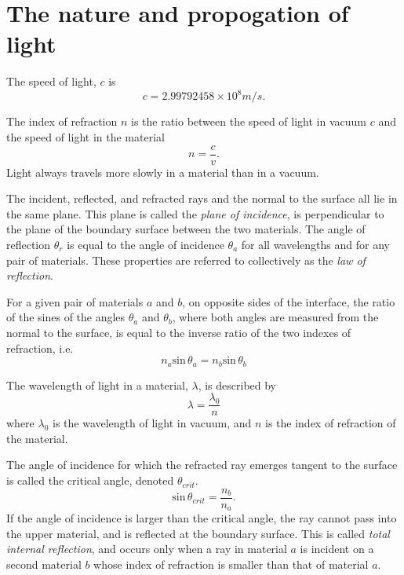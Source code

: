 \documentclass[nobib,notoc]{tufte-handout}
\begin{document}
\section{The nature and propogation of light}
\begin{defi}[c]
	The speed of light, \(c\) is
	\begin{equation*}
		c=2.99792458\times10^8 m/s.
	\end{equation*}
\end{defi}
\begin{defi}
	The index of refraction \(n\) is the ratio between the speed of light in vacuum \(c\) and the speed of light in the material
	\begin{equation*}
		n=\frac{c}{v}.
	\end{equation*}
	Light always travels more slowly in a material than in a vacuum.
\end{defi}
\begin{rema}
	The incident, reflected, and refracted rays and the normal to the surface all lie in the same plane. This plane is called the \emph{plane of incidence}, is perpendicular to the plane of the boundary surface between the two materials. The angle of reflection \(\theta_r\) is equal to the angle of incidence \(\theta_a\) for all wavelengths and for any pair of materials. These properties are referred to collectively as the \emph{law of reflection}.
\end{rema}
\begin{defi}
	For a given pair of materials \(a\) and \(b\), on opposite sides of the interface, the ratio of the sines of the angles \(\theta_a\) and \(\theta_b\), where both angles are measured from the normal to the surface, is equal to the inverse ratio of the two indexes of refraction, i.e.
	\begin{equation*}
		n_a\text{sin}\,\theta_a=n_b\text{sin}\,\theta_b
	\end{equation*}
\end{defi}
\begin{defi}
	The wavelength of light in a material, \(\lambda\), is described by
	\begin{equation*}
		\lambda=\frac{\lambda_0}{n}
	\end{equation*}
	where \(\lambda_0\) is the wavelength of light in vacuum, and \(n\) is the index of refraction of the material.
\end{defi}
\begin{defi}
	The angle of incidence for which the refracted ray emerges tangent to the surface is called the critical angle, denoted \(\theta_{crit}\).
	\begin{equation*}
		\text{sin}\,\theta_{crit}=\frac{n_b}{n_a}.
	\end{equation*}
If the angle of incidence is larger than the critical angle, the ray cannot pass into the upper material, and is reflected at the boundary surface. This is called \emph{total internal reflection}, and occurs only when a ray in material \(a\) is incident on a second material \(b\) whose index of refraction is smaller than that of material \(a\).
\end{defi}
\end{document}
